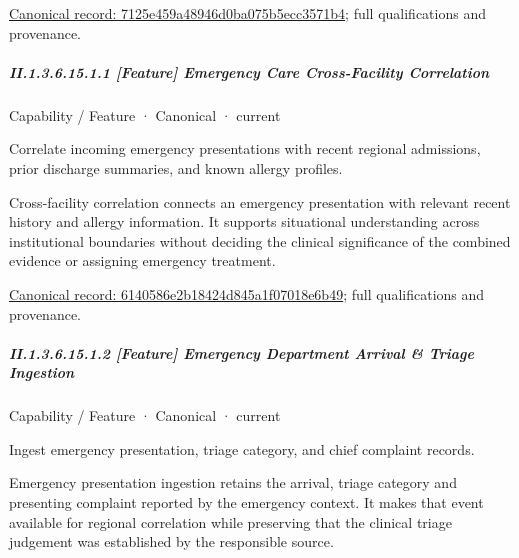 {\footnotesize \href{../../../../../../../continuum/strategy/capability/7125e459a48946d0ba075b5ecc3571b4.md}{Canonical record: 7125e459a48946d0ba075b5ecc3571b4}; full qualifications and provenance.}\par
\subparagraph*{II.1.3.6.15.1.1 [Feature] Emergency Care Cross-Facility Correlation}
\label{navigation:II.1.3.6.15.1.1}

\label{element:6140586e2b18424d845a1f07018e6b49}
{\small Capability / Feature · Canonical · current}\par

Correlate incoming emergency presentations with recent regional admissions, prior discharge summaries, and known allergy profiles.



Cross-facility correlation connects an emergency presentation with relevant recent history and allergy information. It supports situational understanding across institutional boundaries without deciding the clinical significance of the combined evidence or assigning emergency treatment.


{\footnotesize \href{../../../../../../../continuum/strategy/capability/feature/6140586e2b18424d845a1f07018e6b49.md}{Canonical record: 6140586e2b18424d845a1f07018e6b49}; full qualifications and provenance.}\par
\subparagraph*{II.1.3.6.15.1.2 [Feature] Emergency Department Arrival \& Triage Ingestion}
\label{navigation:II.1.3.6.15.1.2}

\label{element:1eb4053512164f6f976a9767da9ba7a7}
{\small Capability / Feature · Canonical · current}\par

Ingest emergency presentation, triage category, and chief complaint records.



Emergency presentation ingestion retains the arrival, triage category and presenting complaint reported by the emergency context. It makes that event available for regional correlation while preserving that the clinical triage judgement was established by the responsible source.


